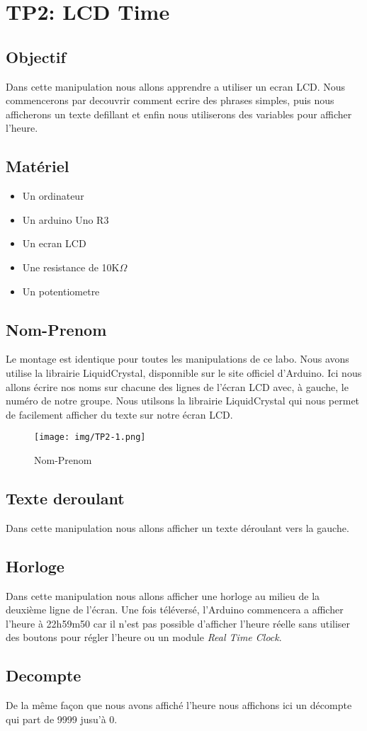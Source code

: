 \section{TP2: LCD Time}
\subsection{Objectif}
Dans cette manipulation nous allons apprendre a utiliser un ecran LCD\@. Nous commencerons par decouvrir comment ecrire des phrases simples, puis nous afficherons un texte defillant et enfin nous utiliserons des variables pour afficher l'heure.
\subsection{Matériel}
\begin{itemize}
	\item Un ordinateur
	\item Un arduino Uno R3
	\item Un ecran LCD
	\item Une resistance de 10K$\Omega$
	\item Un potentiometre
\end{itemize}

\subsection{Nom-Prenom}
Le montage est identique pour toutes les manipulations de ce labo. Nous avons utilise la librairie LiquidCrystal, disponnible sur le site officiel d'Arduino. Ici nous allons écrire nos noms sur chacune des lignes de l'écran LCD avec, à gauche, le numéro de notre groupe. Nous utilsons la librairie LiquidCrystal qui nous permet de facilement afficher du texte sur notre écran LCD\@.

\begin{figure}[H]
	\centering
	\texttt{[image: img/TP2-1.png]}
	\caption{\label{TP2.1}Nom-Prenom}
\end{figure}

\subsection{Texte deroulant}
Dans cette manipulation nous allons afficher un texte déroulant vers la gauche.


\subsection{Horloge}
Dans cette manipulation nous allons afficher une horloge au milieu de la deuxième ligne de l'écran. Une fois téléversé, l'Arduino commencera a afficher l'heure à 22h59m50 car il n'est pas possible d'afficher l'heure réelle sans utiliser des boutons pour régler l'heure ou un module \textit{Real Time Clock}.


\subsection{Decompte}
De la même façon que nous avons affiché l'heure nous affichons ici un décompte qui part de 9999 jusu'à 0.


